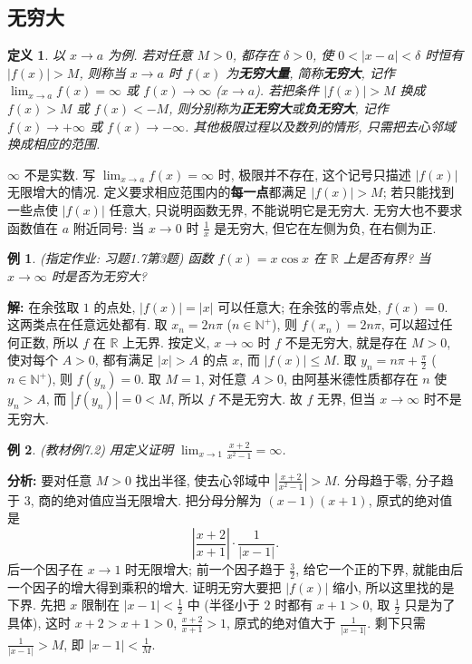 \documentclass[UTF8,openany]{ctexbook}
\theoremstyle{chinesetextbook}
\newtheorem{definition}{定义}[section]
\newtheorem{example}{例}[section]
\newenvironment{cnsolution}{\par\indent\textbf{解:} \ignorespaces}{\par}
\begin{document}
\subsection{无穷大}
\begin{definition}
以 $x\to a$ 为例. 若对任意 $M>0$, 都存在 $\delta>0$, 使 $0<|x-a|<\delta$ 时恒有 $|f(x)|>M$, 则称当 $x\to a$ 时 $f(x)$ 为\textbf{无穷大量}, 简称\textbf{无穷大}, 记作 $\displaystyle\lim_{x\to a}f(x)=\infty$ 或 $f(x)\to\infty$ ($x\to a$). 若把条件 $|f(x)|>M$ 换成 $f(x)>M$ 或 $f(x)<-M$, 则分别称为\textbf{正无穷大}或\textbf{负无穷大}, 记作 $f(x)\to+\infty$ 或 $f(x)\to-\infty$. 其他极限过程以及数列的情形, 只需把去心邻域换成相应的范围.
\end{definition}
$\infty$ 不是实数. 写 $\displaystyle\lim_{x\to a}f(x)=\infty$ 时, 极限并不存在, 这个记号只描述 $|f(x)|$ 无限增大的情况. 定义要求相应范围内的\textbf{每一点}都满足 $|f(x)|>M$; 若只能找到一些点使 $|f(x)|$ 任意大, 只说明函数无界, 不能说明它是无穷大. 无穷大也不要求函数值在 $a$ 附近同号: 当 $x\to0$ 时 $\displaystyle\frac1x$ 是无穷大, 但它在左侧为负, 在右侧为正.
\begin{example}
\textnormal{(指定作业: 习题1.7第3题)} 函数 $f(x)=x\cos x$ 在 $\mathbb R$ 上是否有界? 当 $x\to\infty$ 时是否为无穷大?
\end{example}
\begin{cnsolution}
在余弦取 $1$ 的点处, $|f(x)|=|x|$ 可以任意大; 在余弦的零点处, $f(x)=0$. 这两类点在任意远处都有. 取 $x_n=2n\pi$ ($n\in\mathbb N^+$), 则 $f(x_n)=2n\pi$, 可以超过任何正数, 所以 $f$ 在 $\mathbb R$ 上无界. 按定义, $x\to\infty$ 时 $f$ 不是无穷大, 就是存在 $M>0$, 使对每个 $A>0$, 都有满足 $|x|>A$ 的点 $x$, 而 $|f(x)|\le M$. 取 $\displaystyle y_n=n\pi+\frac\pi2$ ($n\in\mathbb N^+$), 则 $f(y_n)=0$. 取 $M=1$, 对任意 $A>0$, 由阿基米德性质都存在 $n$ 使 $y_n>A$, 而 $|f(y_n)|=0<M$, 所以 $f$ 不是无穷大. 故 $f$ 无界, 但当 $x\to\infty$ 时不是无穷大.
\end{cnsolution}
\begin{example}
\textnormal{(教材例7.2)} 用定义证明 $\displaystyle\lim_{x\to1}\frac{x+2}{x^2-1}=\infty$.
\end{example}
\par\indent\textbf{分析:} 要对任意 $M>0$ 找出半径, 使去心邻域中 $\displaystyle\left|\frac{x+2}{x^2-1}\right|>M$. 分母趋于零, 分子趋于 $3$, 商的绝对值应当无限增大. 把分母分解为 $(x-1)(x+1)$, 原式的绝对值是
\[
\left|\frac{x+2}{x+1}\right|\cdot\frac1{|x-1|}.
\]
后一个因子在 $x\to1$ 时无限增大; 前一个因子趋于 $\displaystyle\frac32$, 给它一个正的下界, 就能由后一个因子的增大得到乘积的增大. 证明无穷大要把 $|f(x)|$ 缩小, 所以这里找的是下界. 先把 $x$ 限制在 $\displaystyle|x-1|<\frac12$ 中 (半径小于 $2$ 时都有 $x+1>0$, 取 $\displaystyle\frac12$ 只是为了具体), 这时 $x+2>x+1>0$, $\displaystyle\frac{x+2}{x+1}>1$, 原式的绝对值大于 $\displaystyle\frac1{|x-1|}$. 剩下只需 $\displaystyle\frac1{|x-1|}>M$, 即 $\displaystyle|x-1|<\frac1M$.
\end{document}
